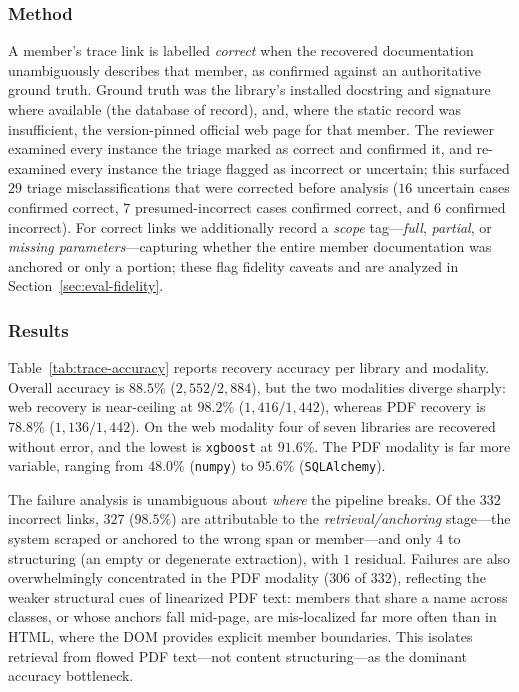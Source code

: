 \subsubsection{Method}
A member's trace link is labelled \emph{correct} when the recovered
documentation unambiguously describes that member, as confirmed against an
authoritative ground truth. Ground truth was the library's installed docstring
and signature where available (the database of record), and, where the static
record was insufficient, the version-pinned official web page for that member.
The reviewer examined every instance the triage marked as correct and confirmed
it, and re-examined every instance the triage flagged as incorrect or uncertain;
this surfaced $29$ triage misclassifications that were corrected before
analysis ($16$ uncertain cases confirmed correct, $7$ presumed-incorrect cases
confirmed correct, and $6$ confirmed incorrect). For correct links we
additionally record a \emph{scope} tag---\emph{full}, \emph{partial}, or
\emph{missing parameters}---capturing whether the entire member documentation was
anchored or only a portion; these flag fidelity caveats and are analyzed in
Section~\ref{sec:eval-fidelity}.

\subsubsection{Results}
Table~\ref{tab:trace-accuracy} reports recovery accuracy per library and
modality. Overall accuracy is $88.5\%$ ($2{,}552/2{,}884$), but the two
modalities diverge sharply: web recovery is near-ceiling at $98.2\%$
($1{,}416/1{,}442$), whereas PDF recovery is $78.8\%$ ($1{,}136/1{,}442$). On
the web modality four of seven libraries are recovered without error, and the
lowest is \texttt{xgboost} at $91.6\%$. The PDF modality is far more variable,
ranging from $48.0\%$ (\texttt{numpy}) to $95.6\%$ (\texttt{SQLAlchemy}).

The failure analysis is unambiguous about \emph{where} the pipeline breaks.
Of the $332$ incorrect links, $327$ ($98.5\%$) are attributable to the
\emph{retrieval/anchoring} stage---the system scraped or anchored to the wrong
span or member---and only $4$ to structuring (an empty or degenerate
extraction), with $1$ residual. Failures are also overwhelmingly concentrated in
the PDF modality ($306$ of $332$), reflecting the weaker structural cues of
linearized PDF text: members that share a name across classes, or whose
anchors fall mid-page, are mis-localized far more often than in HTML, where the
DOM provides explicit member boundaries. This isolates retrieval from
flowed PDF text---not content structuring---as the dominant accuracy bottleneck.


